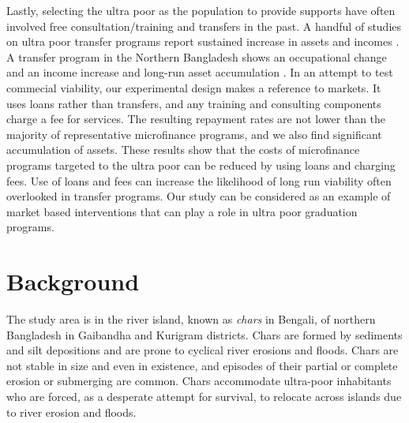 	Lastly, selecting the ultra poor as the population to provide supports have often involved free consultation/training and transfers in the past. A handful of studies on ultra poor transfer programs report sustained increase in assets and incomes \citep{Blattman2014, BanerjeeetalScience2015, Blattmanetal2016, HaushoferShapiro2016}. A transfer program in the Northern Bangladesh shows an occupational change and an income increase \citep{BandieraBRAC2017} and long-run asset accumulation \citep{Balboni2020}. %
	In an attempt to test commecial viability, our experimental design makes a reference to markets. It uses loans rather than transfers, and any training and consulting components charge a fee for services. The resulting repayment rates are not lower than the majority of representative microfinance programs, and we also find significant accumulation of assets. These results show that the costs of microfinance programs targeted to the ultra poor can be reduced by using loans and charging fees. Use of loans and fees can increase the likelihood of long run viability often overlooked in transfer programs.\label{PageOfCostsMFReduced} Our study can be considered as an example of market based interventions that can play a role in ultra poor graduation programs.


\section{Background}
\label{SecBackground}


	The study area is in the river island, known as \textit{chars} in Bengali, of northern Bangladesh in Gaibandha and Kurigram districts. Chars are formed by sediments and silt depositions and are prone to cyclical river erosions and floods. Chars are not stable in size and even in existence, and episodes of their partial or complete erosion or submerging are common. Chars accommodate ultra-poor inhabitants who are forced, as a desperate attempt for survival, to relocate across islands due to river erosion and floods.

